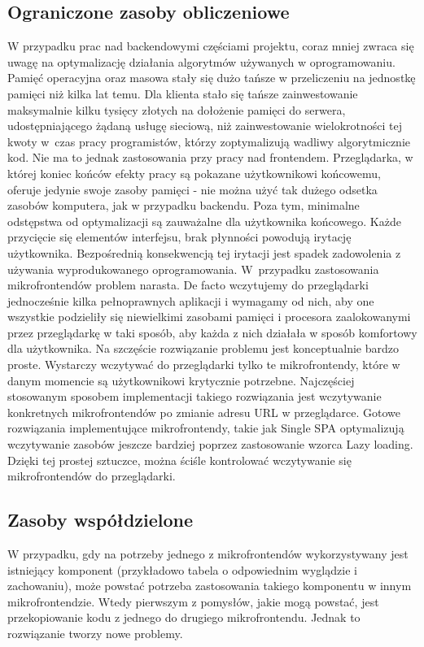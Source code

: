 \documentclass{SGGW-thesis}
\begin{document}
\subsection{Ograniczone zasoby obliczeniowe}
W przypadku prac nad backendowymi częściami projektu, coraz mniej zwraca się uwagę na optymalizację działania algorytmów używanych w oprogramowaniu. Pamięć operacyjna oraz masowa stały się dużo tańsze w przeliczeniu na jednostkę pamięci niż kilka lat temu. Dla klienta stało się tańsze zainwestowanie maksymalnie kilku tysięcy złotych na dołożenie pamięci do serwera, udostępniającego żądaną usługę sieciową, niż zainwestowanie wielokrotności tej kwoty w~czas pracy programistów, którzy zoptymalizują wadliwy algorytmicznie kod.
Nie ma to jednak zastosowania przy pracy nad frontendem. Przeglądarka, w której koniec końców efekty pracy są pokazane użytkownikowi końcowemu, oferuje jedynie swoje zasoby pamięci - nie można użyć tak dużego odsetka zasobów komputera, jak w przypadku backendu. Poza tym, minimalne odstępstwa od optymalizacji są zauważalne dla użytkownika końcowego. Każde przycięcie się elementów interfejsu, brak płynności powodują irytację użytkownika. Bezpośrednią konsekwencją tej irytacji jest spadek zadowolenia z używania wyprodukowanego oprogramowania. W~przypadku zastosowania mikrofrontendów problem narasta. De facto wczytujemy do przeglądarki jednocześnie kilka pełnoprawnych aplikacji i wymagamy od nich, aby one wszystkie podzieliły się niewielkimi zasobami pamięci i procesora zaalokowanymi przez przeglądarkę w taki sposób, aby każda z nich działała w sposób komfortowy dla użytkownika. Na szczęście rozwiązanie problemu jest konceptualnie bardzo proste. Wystarczy wczytywać do przeglądarki tylko te mikrofrontendy, które w danym momencie są użytkownikowi krytycznie potrzebne. Najczęściej stosowanym sposobem implementacji takiego rozwiązania jest wczytywanie konkretnych mikrofrontendów po zmianie adresu URL w przeglądarce. Gotowe rozwiązania implementujące mikrofrontendy, takie jak Single SPA \cite{singlespa} optymalizują wczytywanie zasobów jeszcze bardziej poprzez zastosowanie wzorca Lazy loading. Dzięki tej prostej sztuczce, można ściśle kontrolować wczytywanie się mikrofrontendów do przeglądarki.

\subsection{Zasoby współdzielone}
W przypadku, gdy na potrzeby jednego z mikrofrontendów wykorzystywany jest istniejący komponent (przykładowo tabela o odpowiednim wyglądzie i zachowaniu), może powstać potrzeba zastosowania takiego komponentu w innym mikrofrontendzie. Wtedy pierwszym z pomysłów, jakie mogą powstać, jest przekopiowanie kodu z jednego do drugiego mikrofrontendu. Jednak to rozwiązanie tworzy nowe problemy.
\end{document}
